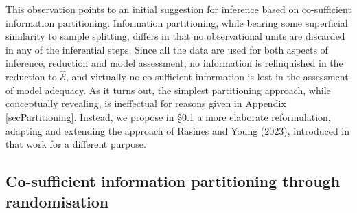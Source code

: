 \documentclass[10pt, reqno]{amsart}
\numberwithin{equation}{section}
\begin{document}
This observation points to an initial suggestion for inference based on co-sufficient information partitioning. Information partitioning, while bearing some superficial similarity to sample splitting, differs in that no observational units are discarded in any of the inferential steps. Since all the data are used for both aspects of inference, reduction and model assessment, no information is relinquished in the reduction to $\hat{\mathcal{E}}$, and virtually no co-sufficient information is lost in the assessment of model adequacy. As it turns out, the simplest partitioning approach, while conceptually revealing, is ineffectual for reasons given in Appendix \ref{secPartitioning}. Instead, we propose in \S \ref{secRandomisation} a more elaborate reformulation, adapting and extending the approach of Rasines and Young (2023), introduced in that work for a different purpose.


\subsection{Co-sufficient information partitioning through randomisation} \label{secRandomisation}
\end{document}
